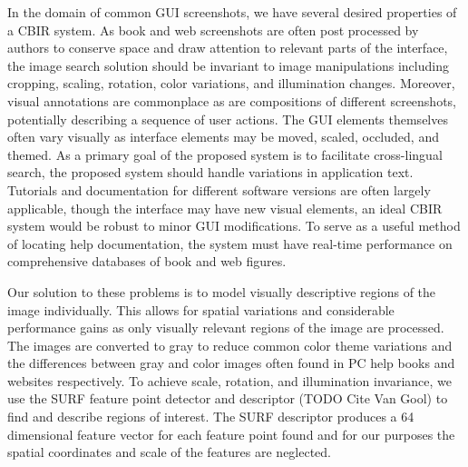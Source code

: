 \documentclass{www2010-submission}
\begin{document}
In the domain of common GUI screenshots, we have several desired
properties of a CBIR system.  As book and web screenshots are often
post processed by authors to conserve space and draw attention to
relevant parts of the interface, the image search solution should be
invariant to image manipulations including cropping, scaling,
rotation, color variations, and illumination changes.  Moreover,
visual annotations are commonplace as are compositions of different
screenshots, potentially describing a sequence of user actions.  The
GUI elements themselves often vary visually as interface elements may
be moved, scaled, occluded, and themed.  As a primary goal of the
proposed system is to facilitate cross-lingual search, the proposed
system should handle variations in application text.  Tutorials and
documentation for different software versions are often largely
applicable, though the interface may have new visual elements, an
ideal CBIR system would be robust to minor GUI modifications.  To
serve as a useful method of locating help documentation, the system
must have real-time performance on comprehensive databases of book and
web figures.

Our solution to these problems is to model visually descriptive
regions of the image individually.  This allows for spatial variations
and considerable performance gains as only visually relevant regions
of the image are processed.  The images are converted to gray to
reduce common color theme variations and the differences between gray
and color images often found in PC help books and websites
respectively.  To achieve scale, rotation, and illumination
invariance, we use the SURF feature point detector and descriptor
(TODO Cite Van Gool) to find and describe regions of interest.  The
SURF descriptor produces a 64 dimensional feature vector for each
feature point found and for our purposes the spatial coordinates and
scale of the features are neglected.
\end{document}
